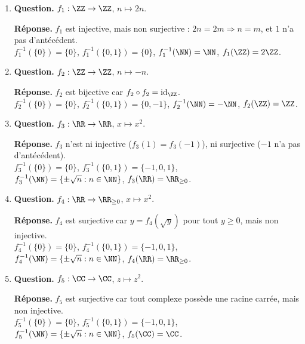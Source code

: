 \documentclass[12pt, a4paper]{article}
\begin{document}
\begin{enumerate}[label=1.\arabic*., start=15]
\begin{minipage}[t]{\linewidth}
\begin{enumerate}[\arabic*.]
      \item \textbf{Question.} $f_1:\ZZ\to\ZZ$, $n\mapsto2n$.
\par\smallskip
\textbf{Réponse.} $f_1$ est injective, mais non surjective : $2n=2m\Rightarrow n=m$, et $1$ n'a pas d'antécédent.\\
      $f_1^{-1}(\{0\})=\{0\}$, $f_1^{-1}(\{0,1\})=\{0\}$, $f_1^{-1}(\NN)=\NN$, $f_1(\ZZ)=2\ZZ$.

  \item \textbf{Question.} $f_2:\ZZ\to\ZZ$, $n\mapsto-n$.
\par\smallskip
\textbf{Réponse.} $f_2$ est bijective car $f_2\circ f_2=\operatorname{id}_{\ZZ}$.\\
      $f_2^{-1}(\{0\})=\{0\}$, $f_2^{-1}(\{0,1\})=\{0,-1\}$, $f_2^{-1}(\NN)=-\NN$, $f_2(\ZZ)=\ZZ$.

  \item \textbf{Question.} $f_3:\RR\to\RR$, $x\mapsto x^2$.
\par\smallskip
\textbf{Réponse.} $f_3$ n'est ni injective ($f_3(1)=f_3(-1)$), ni surjective ($-1$ n'a pas d'antécédent).\\
      $f_3^{-1}(\{0\})=\{0\}$, $f_3^{-1}(\{0,1\})=\{-1,0,1\}$,\\
      $f_3^{-1}(\NN)=\{\pm\sqrt n:n\in\NN\}$, $f_3(\RR)=\RR_{\geq0}$.

  \item \textbf{Question.} $f_4:\RR\to\RR_{\geq0}$, $x\mapsto x^2$.
\par\smallskip
\textbf{Réponse.} $f_4$ est surjective car $y=f_4(\sqrt y)$ pour tout $y\geq0$, mais non injective.\\
      $f_4^{-1}(\{0\})=\{0\}$, $f_4^{-1}(\{0,1\})=\{-1,0,1\}$,\\
      $f_4^{-1}(\NN)=\{\pm\sqrt n:n\in\NN\}$, $f_4(\RR)=\RR_{\geq0}$.

  \item \textbf{Question.} $f_5:\CC\to\CC$, $z\mapsto z^2$.
\par\smallskip
\textbf{Réponse.} $f_5$ est surjective car tout complexe possède une racine carrée, mais non injective.\\
      $f_5^{-1}(\{0\})=\{0\}$, $f_5^{-1}(\{0,1\})=\{-1,0,1\}$,\\
      $f_5^{-1}(\NN)=\{\pm\sqrt n:n\in\NN\}$, $f_5(\CC)=\CC$.

\end{enumerate}
\end{minipage}


\end{enumerate}
\end{document}
